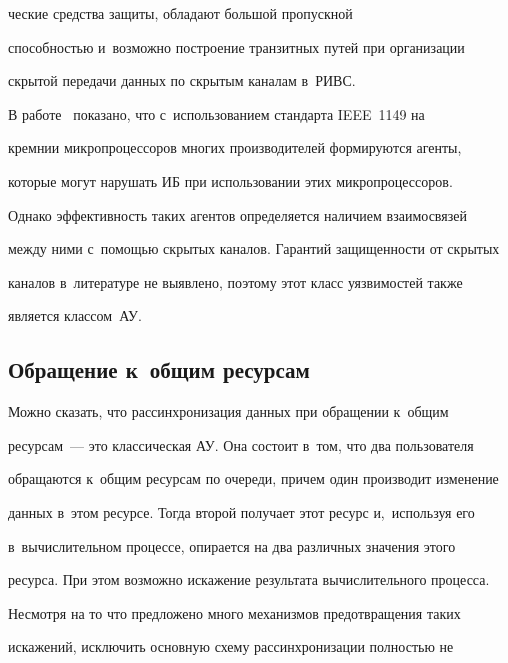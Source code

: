 \noindent


ческие средства защиты, обладают большой пропускной 


способностью и~возможно построение транзитных путей при организации 


скрытой передачи данных по скрытым каналам в~РИВС. 


  


  В работе~\cite{3-g2} показано, что с~использованием стандарта IEEE~1149 на 


кремнии микропроцессоров многих производителей формируются агенты, 


которые могут нарушать ИБ при использовании этих микропроцессоров. 


Однако эффективность таких агентов определяется наличием взаимосвязей 


между ними с~помощью скрытых каналов. Гарантий защищенности от скрытых 


каналов в~литературе не выявлено, поэтому этот класс уязвимостей также 


является классом~АУ.





\vspace*{-4pt}


  


\subsection{Обращение к~общим ресурсам }





  Можно сказать, что рассинхронизация данных при обращении к~общим 


ресурсам~--- это классическая АУ. Она состоит в~том, что два пользователя 


обращаются к~общим ресурсам по очереди, причем один производит изменение 


данных в~этом ресурсе. Тогда второй получает этот ресурс и,~используя его 


в~вычислительном процессе, опирается на два различных значения этого 


ресурса. При этом возможно искажение результата вычислительного процесса. 


Несмотря на то что предложено много механизмов предотвращения таких 


искажений, исключить основную схему рассинхронизации полностью не 


